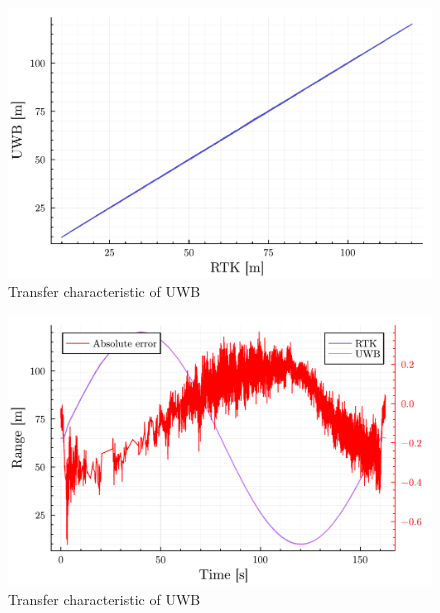 \documentclass[twoside]{ctustyle/ctuthesis}
\theoremstyle{plain}
\theoremstyle{definition}
\theoremstyle{note}
\begin{document}
\begin{figure}

{\centering \includegraphics{sections/experiments_files/figure-pdf/fig-tranfer-function-output-1.pdf}

}

\caption{\label{fig-tranfer-function}Transfer characteristic of UWB}

\end{figure}

\begin{figure}

{\centering \includegraphics{sections/experiments_files/figure-pdf/fig-line-in-time-output-1.pdf}

}

\caption{\label{fig-line-in-time}Transfer characteristic of UWB}

\end{figure}
\end{document}
